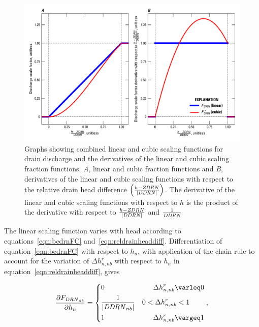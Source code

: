\begin{figure}[!ht]
	\begin{center}
	\includegraphics{./Figures/DischargeScaleFactor.pdf}
	\caption[Graphs showing combined linear and cubic scaling functions for drain discharge and the derivatives of the linear and cubic scaling fraction functions]{Graphs showing combined linear and cubic scaling functions for drain discharge and the derivatives of the linear and cubic scaling fraction functions. \textit{A}, linear and cubic fraction functions and \textit{B}, derivatives of the linear and cubic scaling functions with respect to the relative drain head difference $\left( \frac{h - \mathit{ZDRN}}{\left| \mathit{DDRN} \right|} \right)$. The derivative of the linear and cubic scaling functions with respect to $h$ is the product of the derivative with respect to $\frac{h - \mathit{ZDRN}}{\left| \mathit{DDRN} \right|}$ and $\frac{1}{\mathit{DDRN}}$}
	\label{fig:drndischscalef}
	\end{center}
\end{figure}

The linear scaling function varies with head according to equations~\ref{eqn:bcdrnFC} and~\ref{eqn:reldrainheaddiff}. Differentiation of equation~\ref{eqn:bcdrnFC} with respect to $h_n$, with application of the chain rule to account for the variation of $ \Delta h_{n,nb}^{r}$ with respect to $h_n$ in equation~\ref{eqn:reldrainheaddiff}, gives

\begin{equation}
	\label{eqn:bcdrndFC}
	\begin{aligned}
		\frac{\partial F_{\mli{DRN}_{nb}}}{\partial h_n} = \begin{dcases} 
			0 &\phantom{0 <} \Delta h_{n,nb}^{r} \le 0 \\
			\frac{1}{\left| \mli{DDRN}_{nb} \right|}  &0 < \Delta h_{n,nb}^{r} < 1 \\
			1 &\phantom{0 <} \Delta h_{n,nb}^{r} \ge 1
		\end{dcases} ,
	\end{aligned}
\end{equation}

